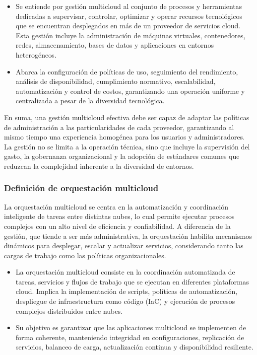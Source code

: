 {                \begin{itemize}
                    \item Se entiende por gestión multicloud al conjunto de procesos y herramientas dedicadas a supervisar, controlar, optimizar y operar recursos tecnológicos que se encuentran desplegados en más de un proveedor de servicios cloud. Esta gestión incluye la administración de máquinas virtuales, contenedores, redes, almacenamiento, bases de datos y aplicaciones en entornos heterogéneos.
                    \item Abarca la configuración de políticas de uso, seguimiento del rendimiento, análisis de disponibilidad, cumplimiento normativo, escalabilidad, automatización y control de costos, garantizando una operación uniforme y centralizada a pesar de la diversidad tecnológica.
                \end{itemize}
                
                En suma, una gestión multicloud efectiva debe ser capaz de adaptar las políticas de administración a las particularidades de cada proveedor, garantizando al mismo tiempo una experiencia homogénea para los usuarios y administradores. La gestión no se limita a la operación técnica, sino que incluye la supervisión del gasto, la gobernanza organizacional y la adopción de estándares comunes que reduzcan la complejidad inherente a la diversidad de entornos.
                
            \subsubsection{Definición de orquestación multicloud}
                La orquestación multicloud se centra en la automatización y coordinación inteligente de tareas entre distintas nubes, lo cual permite ejecutar procesos complejos con un alto nivel de eficiencia y confiabilidad. A diferencia de la gestión, que tiende a ser más administrativa, la orquestación habilita mecanismos dinámicos para desplegar, escalar y actualizar servicios, considerando tanto las cargas de trabajo como las políticas organizacionales.

                \begin{itemize}
                    \item La orquestación multicloud consiste en la coordinación automatizada de tareas, servicios y flujos de trabajo que se ejecutan en diferentes plataformas cloud. Implica la implementación de scripts, políticas de automatización, despliegue de infraestructura como código (IaC) y ejecución de procesos complejos distribuidos entre nubes.
                    \item Su objetivo es garantizar que las aplicaciones multicloud se implementen de forma coherente, manteniendo integridad en configuraciones, replicación de servicios, balanceo de carga, actualización continua y disponibilidad resiliente.
                \end{itemize}
                
}
